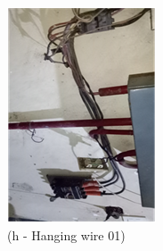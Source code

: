\begin{figure}[!h]
\begin{minipage}[b]{0.22\linewidth}
		\includegraphics[width=\textwidth]{figures/fig_ch04_fdas_hangingwire01}
		\caption*{(h - Hanging wire 01)}
	\end{minipage}
	\hspace{0.03cm}
	\begin{minipage}[b]{0.22\linewidth}

\end{minipage}
\end{figure}
